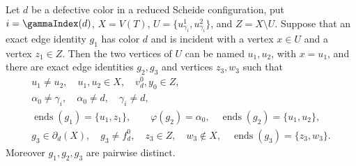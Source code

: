 \begin{helper}
Let $d$ be a defective color in a reduced Scheide configuration, put
$i=\gammaIndex(d)$, $X=V(T)$,
$U=\{u^1_{\gamma_i},u^2_{\gamma_i}\}$, and $Z=X\setminus U$.
Suppose that an exact edge identity $g_1$ has color $d$ and is incident
with a vertex $x\in U$ and a vertex $z_1\in Z$.  Then the two vertices of
$U$ can be named $u_1,u_2$, with $x=u_1$, and there are exact edge
identities $g_2,g_3$ and vertices $z_3,w_3$ such that
\[
 \begin{gathered}
 u_1\ne u_2,\quad u_1,u_2\in X,\quad
 v^0_d,y_0\in Z,\\
 \alpha_0\ne\gamma_i,\quad \alpha_0\ne d,\quad \gamma_i\ne d,\\
 \operatorname{ends}(g_1)=\{u_1,z_1\},\qquad
 \varphi(g_2)=\alpha_0,\quad
 \operatorname{ends}(g_2)=\{u_1,u_2\},\\
 g_3\in\partial_d(X),\quad g_3\ne f^0_d,\quad
 z_3\in Z,\quad w_3\notin X,\quad
 \operatorname{ends}(g_3)=\{z_3,w_3\}.
 \end{gathered}
\]
Moreover $g_1,g_2,g_3$ are pairwise distinct.
\end{helper}

